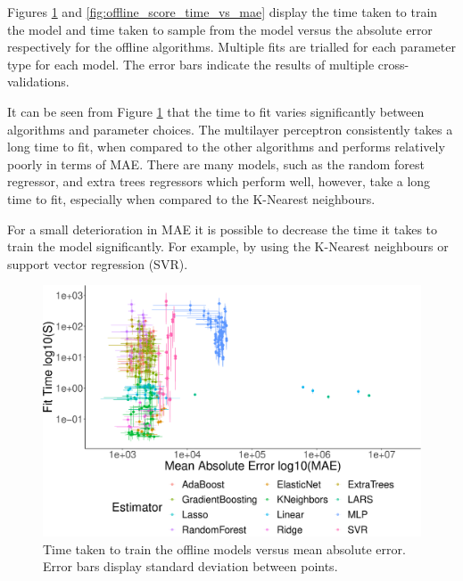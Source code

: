 Figures \ref{fig:offline_fit_time_vs_mae} and \ref{fig:offline_score_time_vs_mae} display the time taken to train the model and time taken to sample from the model versus the absolute error respectively for the offline algorithms. Multiple fits are trialled for each parameter type for each model. The error bars indicate the results of multiple cross-validations.

It can be seen from Figure \ref{fig:offline_fit_time_vs_mae} that the time to fit varies significantly between algorithms and parameter choices. The multilayer perceptron consistently takes a long time to fit, when compared to the other algorithms and performs relatively poorly in terms of MAE. There are many models, such as the random forest regressor, and extra trees regressors which perform well, however, take a long time to fit, especially when compared to the K-Nearest neighbours.

For a small deterioration in MAE it is possible to decrease the time it takes to train the model significantly. For example, by using the K-Nearest neighbours or support vector regression (SVR).


\begin{figure}[h]
\centering
\includegraphics[width=\columnwidth]{Chapter5/figures/market-forecasting/results/offline_fit_time_vs_mae_all_results_opaque.eps}
\caption{Time taken to train the offline models versus mean absolute error. Error bars display standard deviation between points.}
\label{fig:offline_fit_time_vs_mae}
\end{figure}


